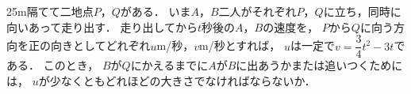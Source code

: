 \documentclass[../../main.tex]{subfiles}
\begin{document}
25m隔てて二地点$P$，$Q$がある．
いま$A$，$B$二人がそれぞれ$P$，$Q$に立ち，同時に向いあって走り出す．
走り出してから$t$秒後の$A$，$B$の速度を，
$P$から$Q$に向う方向を正の向きとしてどれぞれ$u$m/秒，$v$m/秒とすれば，
$u$は一定で$\displaystyle v=\dfrac{3}{4}t^2-3t$である．
このとき，
$B$が$Q$にかえるまでに$A$が$B$に出あうかまたは追いつくためには，
$u$が少なくともどれほどの大きさでなければならないか．
\end{document}
